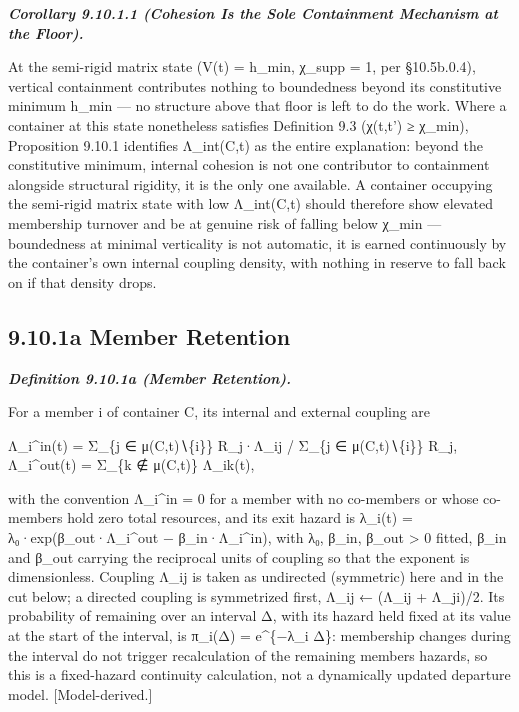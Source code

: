 \documentclass[
]{article}
\begin{document}
\emph{\textbf{Corollary 9.10.1.1 (Cohesion Is the Sole Containment
Mechanism at the Floor).}}

At the semi-rigid matrix state (V(t) = h\_min, χ\_supp = 1, per
§10.5b.0.4), vertical containment contributes nothing to boundedness
beyond its constitutive minimum h\_min --- no structure above that floor
is left to do the work. Where a container at this state nonetheless
satisfies Definition 9.3 (χ(t,t') ≥ χ\_min), Proposition 9.10.1
identifies Λ\_int(C,t) as the entire explanation: beyond the
constitutive minimum, internal cohesion is not one contributor to
containment alongside structural rigidity, it is the only one available.
A container occupying the semi-rigid matrix state with low Λ\_int(C,t)
should therefore show elevated membership turnover and be at genuine
risk of falling below χ\_min --- boundedness at minimal verticality is
not automatic, it is earned continuously by the container's own internal
coupling density, with nothing in reserve to fall back on if that
density drops.

\hypertarget{a-member-retention}{%
\subsection{9.10.1a Member Retention}\label{a-member-retention}}

\emph{\textbf{Definition 9.10.1a (Member Retention).}}

For a member i of container C, its internal and external coupling are

Λ\_i\^{}in(t) = Σ\_\{j ∈ μ(C,t)∖\{i\}\} R\_j·Λ\_ij / Σ\_\{j ∈
μ(C,t)∖\{i\}\} R\_j, Λ\_i\^{}out(t) = Σ\_\{k ∉ μ(C,t)\} Λ\_ik(t),

with the convention Λ\_i\^{}in = 0 for a member with no co-members or
whose co-members hold zero total resources, and its exit hazard is
λ\_i(t) = λ₀·exp(β\_out·Λ\_i\^{}out − β\_in·Λ\_i\^{}in), with λ₀, β\_in,
β\_out \textgreater{} 0 fitted, β\_in and β\_out carrying the reciprocal
units of coupling so that the exponent is dimensionless. Coupling Λ\_ij
is taken as undirected (symmetric) here and in the cut below; a directed
coupling is symmetrized first, Λ\_ij ← (Λ\_ij + Λ\_ji)/2. Its
probability of remaining over an interval Δ, with its hazard held fixed
at its value at the start of the interval, is π\_i(Δ) = e\^{}\{−λ\_i
Δ\}: membership changes during the interval do not trigger recalculation
of the remaining members\textquotesingle{} hazards, so this is a
fixed-hazard continuity calculation, not a dynamically updated departure
model. {[}Model-derived.{]}
\end{document}
